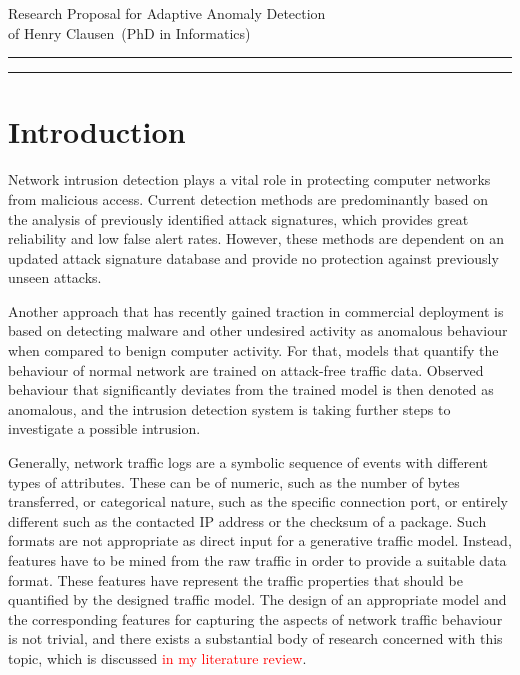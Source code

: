 \documentclass[a4paper,12pt,twoside]{report}
\newcommand{\soptitle}{Research Proposal for Adaptive Anomaly Detection}
\newcommand{\yourname}{Henry Clausen}
\begin{document}
\begin{center}\LARGE\soptitle\\
\normalsize of \yourname\ (PhD in Informatics)
\end{center}
\vspace{-0.2cm}
\hrule
\vspace{1pt}
\hrule height 1pt

\bigskip

\section{Introduction}


Network intrusion detection plays a vital role in protecting computer networks from malicious access. Current detection methods are predominantly based on the analysis of previously identified attack signatures, which provides great reliability and low false alert rates. However, these methods are dependent on an updated attack signature database and provide no protection against previously unseen attacks. 

Another approach that has recently gained traction in commercial deployment is based on detecting malware and other undesired activity as anomalous behaviour when compared to benign computer activity. For that, models that quantify the behaviour of normal network are trained on attack-free traffic data. Observed behaviour that significantly deviates from the trained model is then denoted as anomalous, and the intrusion detection system is taking further steps to investigate a possible intrusion. 

Generally, network traffic logs are a symbolic sequence of events with different types of attributes. These can be of numeric, such as the number of bytes transferred, or categorical nature, such as the specific connection port, or entirely different such as the contacted IP address or the checksum of a package. 
Such formats are not appropriate as direct input for a generative traffic model. Instead, features have to be mined from the raw traffic in order to provide a suitable data format. These features have represent the traffic properties that should be quantified by the designed traffic model. The design of an appropriate model and the corresponding features for capturing the aspects of network traffic behaviour is not trivial, and there exists a substantial body of research concerned with this topic, which is discussed \textcolor{red}{in my literature review}. 
\end{document}
